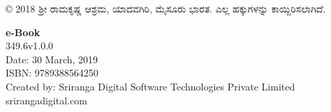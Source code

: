 \thispagestyle{empty}

© 2018 ಶ‍್ರೀ ರಾಮಕೃಷ್ಣ ಆಶ್ರಮ, ಯಾದವಗಿರಿ, ಮೈಸೂರು ಭಾರತ. ಎಲ್ಲ ಹಕ್ಕುಗಳನ್ನು ಕಾಯ್ದಿರಿಸಲಾಗಿದೆ.

 \textbf{e-Book}\\
 349.6v1.0.0\\
 Date: 30 March, 2019\\
 ISBN: 9789388564250\\
 Created by: Sriranga Digital Software Technologies Private Limited\\srirangadigital.com


